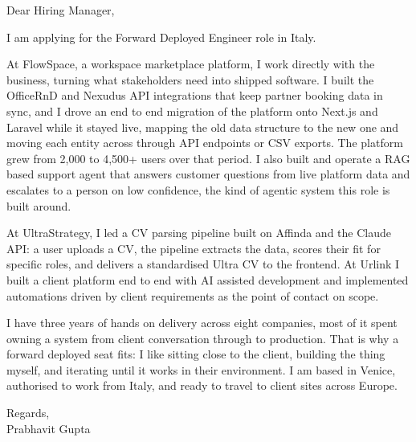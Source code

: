 \documentclass[a4paper,11pt]{article}
\begin{document}
Dear Hiring Manager,

I am applying for the Forward Deployed Engineer role in Italy.

At FlowSpace, a workspace marketplace platform, I work directly with the business, turning what stakeholders need into shipped software. I built the OfficeRnD and Nexudus API integrations that keep partner booking data in sync, and I drove an end to end migration of the platform onto Next.js and Laravel while it stayed live, mapping the old data structure to the new one and moving each entity across through API endpoints or CSV exports. The platform grew from 2,000 to 4,500+ users over that period. I also built and operate a RAG based support agent that answers customer questions from live platform data and escalates to a person on low confidence, the kind of agentic system this role is built around.

At UltraStrategy, I led a CV parsing pipeline built on Affinda and the Claude API: a user uploads a CV, the pipeline extracts the data, scores their fit for specific roles, and delivers a standardised Ultra CV to the frontend. At Urlink I built a client platform end to end with AI assisted development and implemented automations driven by client requirements as the point of contact on scope.

I have three years of hands on delivery across eight companies, most of it spent owning a system from client conversation through to production. That is why a forward deployed seat fits: I like sitting close to the client, building the thing myself, and iterating until it works in their environment. I am based in Venice, authorised to work from Italy, and ready to travel to client sites across Europe.

Regards,\\
Prabhavit Gupta
\end{document}
